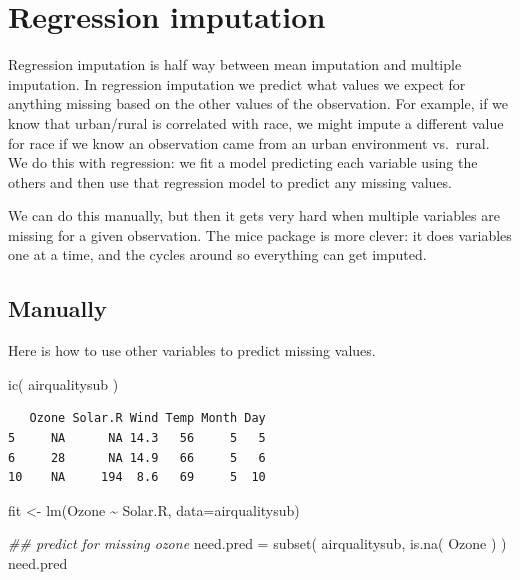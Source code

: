 \documentclass[
  letterpaper,
  DIV=11,
  numbers=noendperiod]{scrreprt}
\newenvironment{Shaded}{\begin{snugshade}}{\end{snugshade}}
\newcommand{\AttributeTok}[1]{\textcolor[rgb]{0.49,0.56,0.16}{#1}}
\newcommand{\DocumentationTok}[1]{\textcolor[rgb]{0.73,0.13,0.13}{\textit{#1}}}
\newcommand{\FunctionTok}[1]{\textcolor[rgb]{0.02,0.16,0.49}{#1}}
\newcommand{\NormalTok}[1]{\textcolor[rgb]{0.00,0.44,0.13}{#1}}
\newcommand{\OtherTok}[1]{\textcolor[rgb]{0.00,0.44,0.13}{#1}}
\newcommand{\SpecialCharTok}[1]{\textcolor[rgb]{0.25,0.44,0.63}{#1}}
\begin{document}
\hypertarget{regression-imputation}{%
\section{Regression imputation}\label{regression-imputation}}

Regression imputation is half way between mean imputation and multiple
imputation. In regression imputation we predict what values we expect
for anything missing based on the other values of the observation. For
example, if we know that urban/rural is correlated with race, we might
impute a different value for race if we know an observation came from an
urban environment vs.~rural. We do this with regression: we fit a model
predicting each variable using the others and then use that regression
model to predict any missing values.

We can do this manually, but then it gets very hard when multiple
variables are missing for a given observation. The mice package is more
clever: it does variables one at a time, and the cycles around so
everything can get imputed.

\hypertarget{manually}{%
\subsection{Manually}\label{manually}}

Here is how to use other variables to predict missing values.

\begin{Shaded}
\begin{Highlighting}[]
  \FunctionTok{ic}\NormalTok{( airqualitysub )}
\end{Highlighting}
\end{Shaded}

\begin{verbatim}
   Ozone Solar.R Wind Temp Month Day
5     NA      NA 14.3   56     5   5
6     28      NA 14.9   66     5   6
10    NA     194  8.6   69     5  10
\end{verbatim}

\begin{Shaded}
\begin{Highlighting}[]
\NormalTok{  fit }\OtherTok{\textless{}{-}} \FunctionTok{lm}\NormalTok{(Ozone }\SpecialCharTok{\textasciitilde{}}\NormalTok{ Solar.R, }\AttributeTok{data=}\NormalTok{airqualitysub)}

\DocumentationTok{\#\# predict for missing ozone  }
\NormalTok{  need.pred }\OtherTok{=} \FunctionTok{subset}\NormalTok{( airqualitysub, }\FunctionTok{is.na}\NormalTok{( Ozone ) )}
\NormalTok{  need.pred}
\end{Highlighting}
\end{Shaded}
\end{document}
